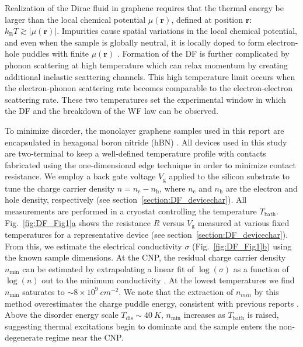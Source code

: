 Realization of the Dirac fluid in graphene requires that the thermal energy be larger than the local chemical potential $\mu(\mathbf{r})$, defined at position $\mathbf{r}$: $k_{\mathrm{B}}T\gtrsim |\mu(\mathbf{r})|$. Impurities cause spatial variations in the local chemical potential, and even when the sample is globally neutral, it is locally doped to form electron-hole puddles with finite $\mu(\mathbf{r})$ \cite{adam_self-consistent_2007, martin_observation_2008, zhang_origin_2009, xue_scanning_2011}. Formation of the DF is further complicated by phonon scattering at high temperature which can relax momentum by creating additional inelastic scattering channels. This high temperature limit occurs when the electron-phonon scattering rate becomes comparable to the electron-electron scattering rate. These two temperatures set the experimental window in which the DF and the breakdown of the WF law can be observed.

To minimize disorder, the monolayer graphene samples used in this report are encapsulated in hexagonal boron nitride (hBN) \cite{dean_boron_2010}. All devices used in this study are two-terminal to keep a well-defined temperature profile \cite{fong_ultrasensitive_2012} with contacts fabricated using the one-dimensional edge technique \cite{wang_one-dimensional_2013} in order to minimize contact resistance. We employ a back gate voltage $V_{\mathrm{g}}$ applied to the silicon substrate to tune the charge carrier density $n=n_{\mathrm{e}}-n_{\mathrm{h}}$, where $n_{\mathrm{e}}$ and $n_{\mathrm{h}}$ are the electron and hole density, respectively (see section~\ref{section:DF_devicechar}). All measurements are performed in a cryostat controlling the temperature $T_{\mathrm{bath}}$. Fig.~\hyperref[fig:DF_Fig1]{\ref*{fig:DF_Fig1}a} shows the resistance $R$ versus $V_{\mathrm{g}}$ measured at various fixed temperatures for a representative device (see section~\ref{section:DF_devicechar}). From this, we estimate the electrical conductivity $\sigma$ (Fig.~\hyperref[fig:DF_Fig1]{\ref*{fig:DF_Fig1}b}) using the known sample dimensions. At the CNP, the residual charge carrier density $n_{\mathrm{min}}$ can be estimated by extrapolating a linear fit of $\log(\sigma)$ as a function of $\log(n)$ out to the minimum conductivity \cite{couto_random_2014}. At the lowest temperatures we find $n_{\mathrm{min}}$ saturates to $\sim 8\times10^9~cm^{-2}$. We note that the extraction of $n_{min}$ by this method overestimates the charge puddle energy, consistent with previous reports \cite{dean_boron_2010}. Above the disorder energy scale $T_{\mathrm{dis}}\sim 40~K$, $n_{\mathrm{min}}$ increases as $T_{\mathrm{bath}}$ is raised, suggesting thermal excitations begin to dominate and the sample enters the non-degenerate regime near the CNP.

